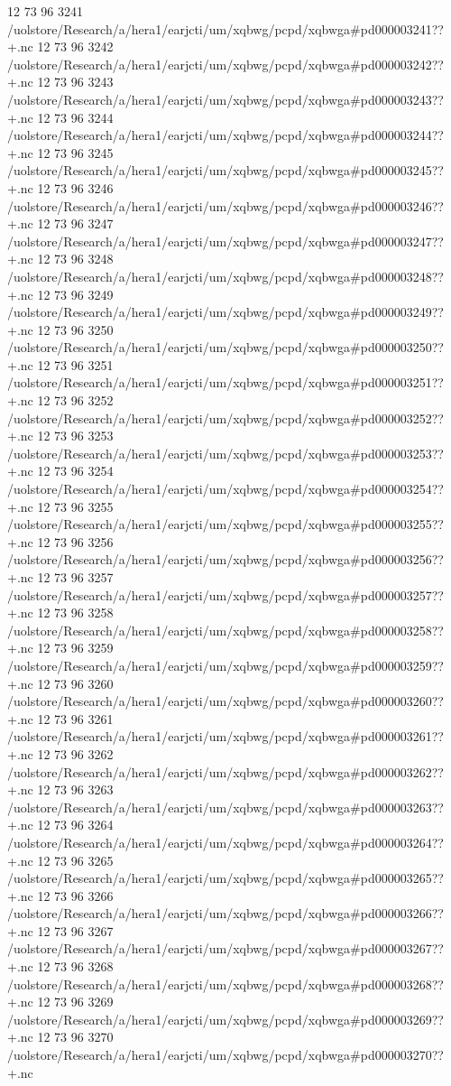 12 73 96
3241
/uolstore/Research/a/hera1/earjcti/um/xqbwg/pcpd/xqbwga#pd000003241??+.nc
12 73 96
3242
/uolstore/Research/a/hera1/earjcti/um/xqbwg/pcpd/xqbwga#pd000003242??+.nc
12 73 96
3243
/uolstore/Research/a/hera1/earjcti/um/xqbwg/pcpd/xqbwga#pd000003243??+.nc
12 73 96
3244
/uolstore/Research/a/hera1/earjcti/um/xqbwg/pcpd/xqbwga#pd000003244??+.nc
12 73 96
3245
/uolstore/Research/a/hera1/earjcti/um/xqbwg/pcpd/xqbwga#pd000003245??+.nc
12 73 96
3246
/uolstore/Research/a/hera1/earjcti/um/xqbwg/pcpd/xqbwga#pd000003246??+.nc
12 73 96
3247
/uolstore/Research/a/hera1/earjcti/um/xqbwg/pcpd/xqbwga#pd000003247??+.nc
12 73 96
3248
/uolstore/Research/a/hera1/earjcti/um/xqbwg/pcpd/xqbwga#pd000003248??+.nc
12 73 96
3249
/uolstore/Research/a/hera1/earjcti/um/xqbwg/pcpd/xqbwga#pd000003249??+.nc
12 73 96
3250
/uolstore/Research/a/hera1/earjcti/um/xqbwg/pcpd/xqbwga#pd000003250??+.nc
12 73 96
3251
/uolstore/Research/a/hera1/earjcti/um/xqbwg/pcpd/xqbwga#pd000003251??+.nc
12 73 96
3252
/uolstore/Research/a/hera1/earjcti/um/xqbwg/pcpd/xqbwga#pd000003252??+.nc
12 73 96
3253
/uolstore/Research/a/hera1/earjcti/um/xqbwg/pcpd/xqbwga#pd000003253??+.nc
12 73 96
3254
/uolstore/Research/a/hera1/earjcti/um/xqbwg/pcpd/xqbwga#pd000003254??+.nc
12 73 96
3255
/uolstore/Research/a/hera1/earjcti/um/xqbwg/pcpd/xqbwga#pd000003255??+.nc
12 73 96
3256
/uolstore/Research/a/hera1/earjcti/um/xqbwg/pcpd/xqbwga#pd000003256??+.nc
12 73 96
3257
/uolstore/Research/a/hera1/earjcti/um/xqbwg/pcpd/xqbwga#pd000003257??+.nc
12 73 96
3258
/uolstore/Research/a/hera1/earjcti/um/xqbwg/pcpd/xqbwga#pd000003258??+.nc
12 73 96
3259
/uolstore/Research/a/hera1/earjcti/um/xqbwg/pcpd/xqbwga#pd000003259??+.nc
12 73 96
3260
/uolstore/Research/a/hera1/earjcti/um/xqbwg/pcpd/xqbwga#pd000003260??+.nc
12 73 96
3261
/uolstore/Research/a/hera1/earjcti/um/xqbwg/pcpd/xqbwga#pd000003261??+.nc
12 73 96
3262
/uolstore/Research/a/hera1/earjcti/um/xqbwg/pcpd/xqbwga#pd000003262??+.nc
12 73 96
3263
/uolstore/Research/a/hera1/earjcti/um/xqbwg/pcpd/xqbwga#pd000003263??+.nc
12 73 96
3264
/uolstore/Research/a/hera1/earjcti/um/xqbwg/pcpd/xqbwga#pd000003264??+.nc
12 73 96
3265
/uolstore/Research/a/hera1/earjcti/um/xqbwg/pcpd/xqbwga#pd000003265??+.nc
12 73 96
3266
/uolstore/Research/a/hera1/earjcti/um/xqbwg/pcpd/xqbwga#pd000003266??+.nc
12 73 96
3267
/uolstore/Research/a/hera1/earjcti/um/xqbwg/pcpd/xqbwga#pd000003267??+.nc
12 73 96
3268
/uolstore/Research/a/hera1/earjcti/um/xqbwg/pcpd/xqbwga#pd000003268??+.nc
12 73 96
3269
/uolstore/Research/a/hera1/earjcti/um/xqbwg/pcpd/xqbwga#pd000003269??+.nc
12 73 96
3270
/uolstore/Research/a/hera1/earjcti/um/xqbwg/pcpd/xqbwga#pd000003270??+.nc

